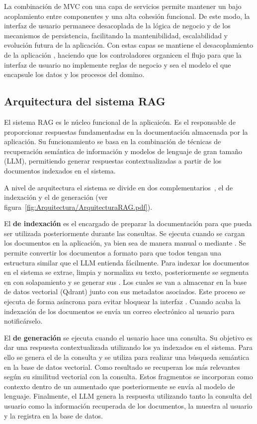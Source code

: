La combinación de MVC con una capa de servicios permite mantener un bajo acoplamiento entre componentes y una alta cohesión funcional. De este modo, la interfaz de usuario permanece desacoplada de la lógica de negocio y de los mecanismos de persistencia, facilitando la mantenibilidad, escalabilidad y evolución futura de la aplicación.
Con estas capas se mantiene el desacoplamiento de la aplicación , haciendo que los controladores organicen el flujo para que la interfaz de usuario no implemente reglas de negocio y sea el modelo el que encapsule los datos y los procesos del domino. 

\subsection{Arquitectura del sistema RAG}
El sistema RAG es le núcleo funcional de la aplicaicón. Es el responsable de proporcionar respuestas fundamentadas en la documentación almacenada por la aplicación. Su funcionamiento se basa en la combinación de técnicas de recuperación semántica de información y modelos de lenguaje de gran tamaño (LLM), permitiendo generar respuestas contextualizadas a partir de los documentos indexados en el sistema.

A nivel de arquitectura el sistema se divide en dos  complementarios~\cite{book:RAG_SimpleGuide}, el de indexación y el de generación (ver figura~\ref{fig:Arquitectura/ArquitecturaRAG.pdf}).


El \textbf{ de indexación} es el encargado de preparar la documentación para que pueda ser utilizada posteriormente durante las consultas. Se ejecuta cuando se cargan los documentos en la aplicación, ya bien sea de manera manual o mediante . Se permite convertir los documentos a formato  para que todos tengan una estructura similar que el LLM entienda fácilmente. Para indexar los documentos en el sistema se extrae, limpia y normaliza su texto, posteriormente se segmenta en  con solapamiento y se generar sus . Los cuales se van a almacenar en la base de datos vectorial (Qdrant) junto con sus metadatos asociados. Este proceso se ejecuta de forma asíncrona para evitar bloquear la interfaz . Cuando acaba la indexación de los documentos se envía un correo electrónico al usuario para notificárselo.

El \textbf{ de generación} se ejecuta cuando el usuario hace una consulta. Su objetivo es dar una respuesta contextualizada utilizando los  ya indexados en el sistema. Para ello se genera el  de la consulta y se utiliza para realizar una búsqueda semántica en la base de datos vectorial. Como resultado se recuperan los  más relevantes según su similitud vectorial con la consulta. Estos fragmentos se incorporan como contexto dentro de un  aumentado que posteriormente se envía al modelo de lenguaje. Finalmente, el LLM genera la respuesta utilizando tanto la consulta del usuario como la información recuperada de los documentos, la muestra al usuario y la registra en la base de datos.

